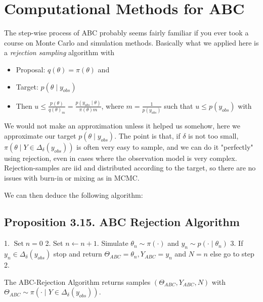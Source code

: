 \documentclass{article}
\begin{document}
\section{Computational Methods for ABC}
The step-wise process of ABC probably seems fairly familiar if you ever took a course on Monte Carlo and simulation methods. Basically what we applied here is a \textit{rejection sampling} algorithm with 
\begin{itemize}
    \item Proposal: $q(\theta)=\pi(\theta)$ and
    \item Target: $p\left(\theta \mid y_{o b s}\right)$
    \item Then $u \leqslant \frac{p(\theta)}{q(\theta)_m} = \frac{p\left(y_{obs} \mid \theta\right)}{\pi(\theta) m}$, where $m = \frac{1}{p\left(y_{obs}\right)}$ such that $u \leqslant p\left(y_{obs}\right)$ with
\end{itemize}

We would not make an approximation unless it helped us somehow, here we approximate our target $p\left(\theta \mid y_{o b s}\right)$. The point is that, if $\delta$ is not too small, $\pi\left(\theta \mid Y \in \Delta_\delta\left(y_{o b s}\right)\right)$ is often very easy to sample, and we can do it "perfectly" using rejection, even in cases where the observation model is very complex. Rejection-samples are iid and distributed according to the target, so there are no issues with burn-in or mixing as in MCMC.

We can then deduce the following algorithm:\newline
\subsection{Proposition 3.15. ABC Rejection Algorithm}
1. $\operatorname{Set} n=0$
2. Set $n \leftarrow n+1$. Simulate $\theta_n \sim \pi(\cdot)$ and $y_n \sim p\left(\cdot \mid \theta_n\right)$
3. If $y_n \in \Delta_\delta\left(y_{o b s}\right)$ stop and return $\Theta_{A B C}=\theta_n, Y_{A B C}=y_n$ and $N=n$ else go to step 2.

The ABC-Rejection Algorithm returns samples $\left(\Theta_{A B C}, Y_{A B C}, N\right)$ with $\Theta_{A B C} \sim \pi\left(\cdot \mid Y \in \Delta_\delta\left(y_{o b s}\right)\right)$.
\end{document}
